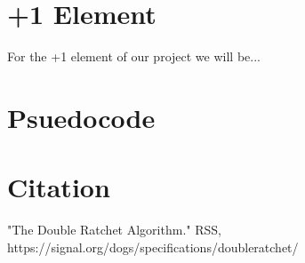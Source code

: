 \documentclass{article}
\begin{document}
\section{+1 Element}

For the +1 element of our project we will be...


\section{Psuedocode}
    \begin{algorithm}
    \begin{algorithmic}

	\EndProcedure
    	\end{algorithmic}
    \end{algorithm}

\section{Citation}

"The Double Ratchet Algorithm." RSS, https://signal.org/dogs/specifications/doubleratchet/


    
	
	    
\end{document}
